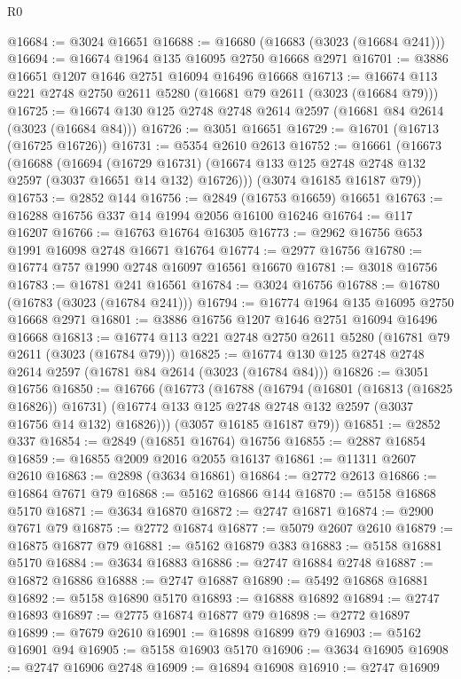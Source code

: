 \begin{lexlean}{R0}
\begin{coremodule}
@16684 := @3024 @16651
@16688 := @16680 (@16683 (@3023 (@16684 @241)))
@16694 := @16674 @1964 @135 @16095 @2750 @16668 @2971
@16701 := @3886 @16651 @1207 @1646 @2751 @16094 @16496 @16668
@16713 := @16674 @113 @221 @2748 @2750 @2611 @5280 (@16681 @79 @2611 (@3023 (@16684 @79)))
@16725 := @16674 @130 @125 @2748 @2748 @2614 @2597 (@16681 @84 @2614 (@3023 (@16684 @84)))
@16726 := @3051 @16651
@16729 := @16701 (@16713 (@16725 @16726))
@16731 := @5354 @2610 @2613
@16752 := @16661
    (@16673
      (@16688
        (@16694
          (@16729 @16731)
          (@16674 @133 @125 @2748 @2748 @132 @2597 (@3037 @16651 @14 @132) @16726)))
      (@3074 @16185 @16187 @79))
@16753 := @2852 @144
@16756 := @2849 (@16753 @16659) @16651
@16763 := @16288 @16756 @337 @14 @1994 @2056 @16100 @16246
@16764 := @117 @16207
@16766 := @16763 @16764 @16305
@16773 := @2962 @16756 @653 @1991 @16098 @2748 @16671 @16764
@16774 := @2977 @16756
@16780 := @16774 @757 @1990 @2748 @16097 @16561 @16670
@16781 := @3018 @16756
@16783 := @16781 @241 @16561
@16784 := @3024 @16756
@16788 := @16780 (@16783 (@3023 (@16784 @241)))
@16794 := @16774 @1964 @135 @16095 @2750 @16668 @2971
@16801 := @3886 @16756 @1207 @1646 @2751 @16094 @16496 @16668
@16813 := @16774 @113 @221 @2748 @2750 @2611 @5280 (@16781 @79 @2611 (@3023 (@16784 @79)))
@16825 := @16774 @130 @125 @2748 @2748 @2614 @2597 (@16781 @84 @2614 (@3023 (@16784 @84)))
@16826 := @3051 @16756
@16850 := @16766
    (@16773
      (@16788
        (@16794
          (@16801 (@16813 (@16825 @16826)) @16731)
          (@16774 @133 @125 @2748 @2748 @132 @2597 (@3037 @16756 @14 @132) @16826)))
      (@3057 @16185 @16187 @79))
@16851 := @2852 @337
@16854 := @2849 (@16851 @16764) @16756
@16855 := @2887 @16854
@16859 := @16855 @2009 @2016 @2055 @16137
@16861 := @11311 @2607 @2610
@16863 := @2898 (@3634 @16861)
@16864 := @2772 @2613
@16866 := @16864 @7671 @79
@16868 := @5162 @16866 @144
@16870 := @5158 @16868 @5170
@16871 := @3634 @16870
@16872 := @2747 @16871
@16874 := @2900 @7671 @79
@16875 := @2772 @16874
@16877 := @5079 @2607 @2610
@16879 := @16875 @16877 @79
@16881 := @5162 @16879 @383
@16883 := @5158 @16881 @5170
@16884 := @3634 @16883
@16886 := @2747 @16884 @2748
@16887 := @16872 @16886
@16888 := @2747 @16887
@16890 := @5492 @16868 @16881
@16892 := @5158 @16890 @5170
@16893 := @16888 @16892
@16894 := @2747 @16893
@16897 := @2775 @16874 @16877 @79
@16898 := @2772 @16897
@16899 := @7679 @2610
@16901 := @16898 @16899 @79
@16903 := @5162 @16901 @94
@16905 := @5158 @16903 @5170
@16906 := @3634 @16905
@16908 := @2747 @16906 @2748
@16909 := @16894 @16908
@16910 := @2747 @16909

\end{coremodule}
\end{lexlean}
